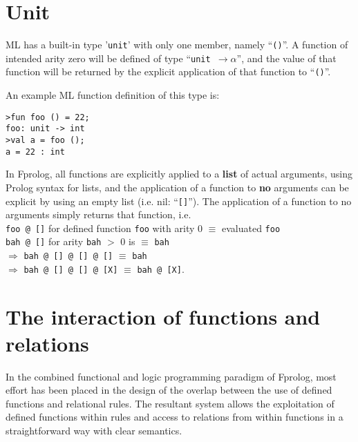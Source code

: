 \documentclass[a4paper,11pt,twoside]{article}
\begin{document}
\section{Unit} %
\label{unit}

ML has a built-in type '\texttt{unit}' with only one member, namely
 ``\texttt{()}''.
A function of intended arity zero will be defined of type
``\texttt{unit $\rightarrow \alpha$}'', and 
the value of that function will be returned by the explicit application
of that function to ``\texttt{()}''.

An example ML function definition of this type is:
\begin{verbatim}
>fun foo () = 22;
foo: unit -> int
>val a = foo ();
a = 22 : int
\end{verbatim}
In Fprolog, all functions are explicitly applied to a \textbf{list} of
actual arguments, using Prolog syntax for lists, and the application of
a function to \textbf{no} arguments can be explicit by using an empty
list (i.e. nil: ``\texttt{[]}'').  The application of a function to no
arguments simply returns that function, i.e.\\
\texttt{foo @ []} for defined function \texttt{foo} with arity 0 $\equiv$ evaluated \texttt{foo}\\
\texttt{bah @ []} for arity \texttt{bah} $>$ 0 is $\equiv$ \texttt{bah}\\
$\Rightarrow$ \texttt{bah @ [] @ [] @ []} $\equiv$ \texttt{bah}\\
$\Rightarrow$ \texttt{bah @ [] @ [] @ [X]} $\equiv$ \texttt{bah @ [X]}.

\section{The interaction of functions and relations} %

In the combined functional and logic programming paradigm of Fprolog, most
effort has been placed in the design of the overlap between the use of
defined functions and relational rules.  The resultant system allows the
exploitation of defined functions within rules and access to relations from
within functions in a straightforward way with clear semantics.
\end{document}
